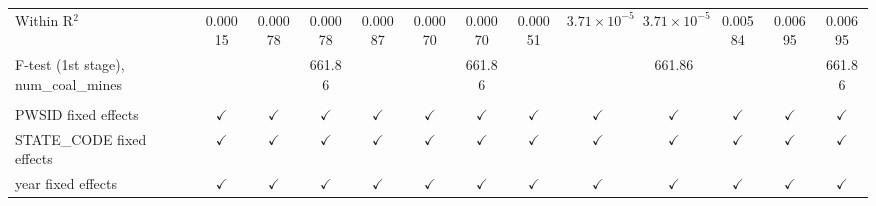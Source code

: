 \begin{table}[htbp]
\begin{adjustbox}{width = \textwidth, center}
\begin{tabular}{lcccccccccccc}
         Within R$^2$                           & 0.00015       & 0.00078       & 0.00078       & 0.00087       & 0.00070       & 0.00070       & 0.00051       & $3.71\times 10^{-5}$  & $3.71\times 10^{-5}$  & 0.00584        & 0.00695         & 0.00695\\  
         F-test (1st stage), num\_coal\_mines   &               &               & 661.86        &               &               & 661.86        &               &                       & 661.86                &                &                 & 661.86\\  
          \\
         PWSID fixed effects                    & $\checkmark$  & $\checkmark$  & $\checkmark$  & $\checkmark$  & $\checkmark$  & $\checkmark$  & $\checkmark$  & $\checkmark$          & $\checkmark$          & $\checkmark$   & $\checkmark$    & $\checkmark$\\   
         STATE\_CODE fixed effects              & $\checkmark$  & $\checkmark$  & $\checkmark$  & $\checkmark$  & $\checkmark$  & $\checkmark$  & $\checkmark$  & $\checkmark$          & $\checkmark$          & $\checkmark$   & $\checkmark$    & $\checkmark$\\   
         year fixed effects                     & $\checkmark$  & $\checkmark$  & $\checkmark$  & $\checkmark$  & $\checkmark$  & $\checkmark$  & $\checkmark$  & $\checkmark$          & $\checkmark$          & $\checkmark$   & $\checkmark$    & $\checkmark$\\   
         \bottomrule
      \end{tabular}
   \end{adjustbox}
\end{table}


